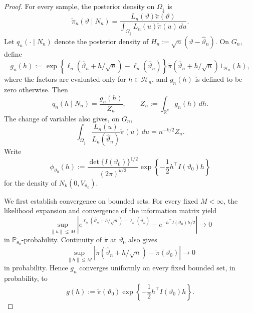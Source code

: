 \documentclass[10pt,a4paper]{amsart}
\theoremstyle{named}
\theoremstyle{named1}
\theoremstyle{plain}
\theoremstyle{remark}
\begin{document}
\begin{proof}
For every sample, the posterior density on $\Omega_{\downarrow}$ is
\[
    \widetilde\pi_n(\vartheta\mid N_n)
    =
    \frac{L_n(\vartheta)\widetilde\pi(\vartheta)}{
        \displaystyle\int_{\Omega_{\downarrow}}
        L_n(u)\widetilde\pi(u)\,du}.
\]
Let $q_n(\cdot\mid N_n)$ denote the posterior density of
$H_n:=\sqrt n(\vartheta-\widehat\vartheta_n)$. On $G_n$, define
\[
    g_n(h)
    :=
    \exp\left\{
        \ell_n(\widehat\vartheta_n+h/\sqrt n)
        -\ell_n(\widehat\vartheta_n)
    \right\}
    \widetilde\pi(\widehat\vartheta_n+h/\sqrt n)
    1_{\mathcal H_n}(h),
\]
where the factors are evaluated only for $h\in\mathcal H_n$, and
$g_n(h)$ is defined to be zero otherwise. Then
\[
    q_n(h\mid N_n)=\frac{g_n(h)}{Z_n},
    \qquad
    Z_n:=\int_{\mathbb R^k}g_n(h)\,dh.
\]
The change of variables also gives, on $G_n$,
\begin{equation}
    \int_{\Omega_{\downarrow}}
    \frac{L_n(u)}{L_n(\widehat\vartheta_n)}
    \widetilde\pi(u)\,du
    =n^{-k/2}Z_n.
    \label{eq:intrinsic-posterior-normalizer}
\end{equation}
Write
\[
    \phi_{\vartheta_0}(h)
    :=
    \frac{\det\{I(\vartheta_0)\}^{1/2}}{(2\pi)^{k/2}}
    \exp\left\{-\frac12h^\top I(\vartheta_0)h\right\}
\]
for the density of $N_k(0,V_{\vartheta_0})$.

We first establish convergence on bounded sets. For every fixed
$M<\infty$, the likelihood expansion and convergence of the information
matrix yield
\begin{equation}
    \sup_{\|h\|\leq M}
    \left|
        e^{\ell_n(\widehat\vartheta_n+h/\sqrt n)
             -\ell_n(\widehat\vartheta_n)}
        -e^{-h^\top I(\vartheta_0)h/2}
    \right|
    \rightarrow0
    \label{local_expansion_exp}
\end{equation}
in $\mathbb P_{\theta_0}$-probability. Continuity of
$\widetilde\pi$ at $\vartheta_0$ also gives
\[
    \sup_{\|h\|\leq M}
    \left|
        \widetilde\pi(\widehat\vartheta_n+h/\sqrt n)
        -\widetilde\pi(\vartheta_0)
    \right|
    \rightarrow0
\]
in probability. Hence $g_n$ converges uniformly on every fixed bounded
set, in probability, to
\begin{equation}
    g(h):=\widetilde\pi(\vartheta_0)
    \exp\left\{-\frac12h^\top I(\vartheta_0)h\right\}.
    \label{eq:local-density-limit}
\end{equation}


\end{proof}
\end{document}
